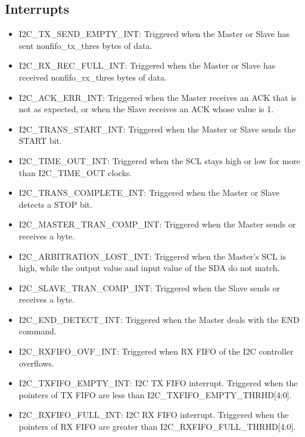 \documentclass[main\_\_EN.tex]{subfiles}
\begin{document}
\subsection{Interrupts}\label{5.3.7}
\begin{itemize}
\item \label{int:I2CTXSENDEMPTYINT}I2C\_TX\_SEND\_EMPTY\_INT: Triggered when the Master or Slave has sent nonfifo\_tx\_thres bytes of data.
\item \label{int:I2CRXRECFULLINT}I2C\_RX\_REC\_FULL\_INT: Triggered when the Master or Slave has received nonfifo\_rx\_thres bytes of data.
\item \label{int:I2CACKERRINT}I2C\_ACK\_ERR\_INT: Triggered when the Master receives an ACK that is not as expected, or when the  Slave receives an ACK whose value is 1.
\item \label{int:I2CTRANSSTARTINT}I2C\_TRANS\_START\_INT: Triggered when the Master or Slave sends the START bit.
\item \label{int:I2CTIMEOUTINT}I2C\_TIME\_OUT\_INT:  Triggered when the SCL stays high or low for more than I2C\_TIME\_OUT clocks.
\item \label{int:I2CTRANSCOMPLETEINT}I2C\_TRANS\_COMPLETE\_INT: Triggered when the Master or Slave detects a STOP bit.
\item \label{int:I2CMASTERTRANCOMPINT}I2C\_MASTER\_TRAN\_COMP\_INT: Triggered when the Master sends or receives a byte.
\item \label{int:I2CARBITRATIONLOSTINT}I2C\_ARBITRATION\_LOST\_INT: Triggered when the Master's SCL is high, while the output value and input value of the SDA do not match.
\item \label{int:I2CSLAVETRANCOMPINT}I2C\_SLAVE\_TRAN\_COMP\_INT: Triggered when the Slave sends or receives a byte.
\item \label{int:I2CENDDETECTINT}I2C\_END\_DETECT\_INT: Triggered when the Master deals with the END command.
\item \label{int:I2CRXFIFOOVFINT}I2C\_RXFIFO\_OVF\_INT: Triggered when RX FIFO of the I2C controller overflows.
\item \label{int:I2CTXFIFOEMPTYINT}I2C\_TXFIFO\_EMPTY\_INT: I2C TX FIFO interrupt. Triggered when the pointers of TX FIFO are less than I2C\_TXFIFO\_EMPTY\_THRHD[4:0].
\item \label{int:I2CRXFIFOFULLINT}I2C\_RXFIFO\_FULL\_INT: I2C RX FIFO interrupt. Triggered when the pointers of RX FIFO are greater than I2C\_RXFIFO\_FULL\_THRHD[4:0].

\end{itemize}
\newpage
\hypertarget{i2c-reg-summ}{}
\end{document}

